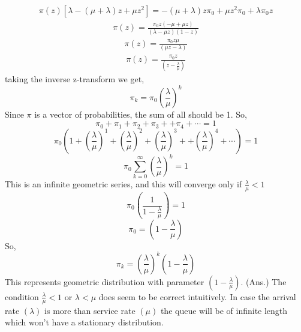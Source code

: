 \documentclass{article}
\theoremstyle{remark}
\begin{document}
\begin{align*}
    \pi(z) \left [ \lambda - (\mu+\lambda) z + \mu z^2  \right ] = - (\mu+\lambda) z \pi_0 + \mu z^2 \pi_0 + \lambda \pi_0 z
\end{align*}
\begin{align*}
    \pi(z) = \frac {\pi_0 z (-\mu+\mu z)}{(\lambda-\mu z)(1-z)}
\end{align*}
\begin{align*}
    \pi(z) = \frac {\pi_0 z \mu }{(\mu z-\lambda)} 
\end{align*}
\begin{align*}
    \pi(z) = \frac {\pi_0 z}{(z-\frac{\lambda}{\mu})}
\end{align*}
taking the inverse z-transform we get,
\[
    \pi_k = \pi_0 \left ( \frac{\lambda}{\mu} \right )^k
\]
Since $\pi$ is a vector of probabilities, the sum of all should be 1.
So,
\[
    \pi_0 + \pi_1 + \pi_2 + \pi_3 + + \pi_4 + \cdots = 1 
\]
\[
    \pi_0 \left ( 1+ \left ( \frac{\lambda}{\mu} \right )^1 + \left ( \frac{\lambda}{\mu} \right )^2 + \left ( \frac{\lambda}{\mu} \right )^3 + + \left ( \frac{\lambda}{\mu} \right )^4 + \cdots \right) = 1
\]
\[
    \pi_0 \sum_{k=0}^{\infty} \left ( \frac{\lambda}{\mu} \right )^k = 1
\]
This is an infinite geometric series, and this will converge only if $\frac{\lambda}{\mu} < 1$
\[
    \pi_0 \left ( \frac{1}{1-\frac{\lambda}{\mu}} \right ) = 1
\]
\[
    \pi_0 = \left ( 1-\frac{\lambda}{\mu} \right )
\]
So,
\[
\pi_k = \left ( \frac{\lambda}{\mu} \right )^k \left (  1-\frac{\lambda}{\mu} \right )
\]
This represents geometric distribution with parameter $\left (  1-\frac{\lambda}{\mu} \right )$. (Ans.)
\newline
The condition $\frac{\lambda}{\mu} < 1$ or $\lambda<\mu$ does seem to be correct intuitively. In case the arrival rate $(\lambda)$ is more than service rate $(\mu)$ the queue will be of infinite length which won't have a stationary distribution.
\end{document}
